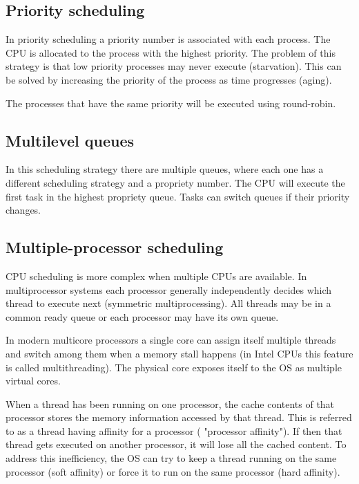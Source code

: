 \subsection{Priority scheduling}
In priority scheduling a priority number is associated with each process. The CPU is allocated to the process with the highest priority. The problem of this strategy is that low priority processes may never execute (starvation). This can be solved by increasing the priority of the process as time progresses (aging).

The processes that have the same priority will be executed using round-robin.

\subsection{Multilevel queues}
In this scheduling strategy there are multiple queues, where each one has a different scheduling strategy and a propriety number. The CPU will execute the first task in the highest propriety queue. Tasks can switch queues if their priority changes.


\subsection{Multiple-processor scheduling}
CPU scheduling is more complex when multiple CPUs are available. In multiprocessor systems each processor generally independently decides which thread to execute next (symmetric multiprocessing). All threads may be in a common ready queue or each processor may have its own queue.

In modern multicore processors a single core can assign itself multiple threads and switch among them when a memory stall happens (in Intel CPUs this feature is called multithreading). The physical core exposes itself to the OS as multiple virtual cores.

When a thread has been running on one processor, the cache contents of that processor stores the memory information accessed by that thread. This is referred to as a thread having affinity for a processor (
"processor affinity"). If then that thread gets executed on another processor, it will lose all the cached content. To address this inefficiency, the OS can try to keep a thread running on the same processor (soft affinity) or force it to run on the same processor (hard affinity).

